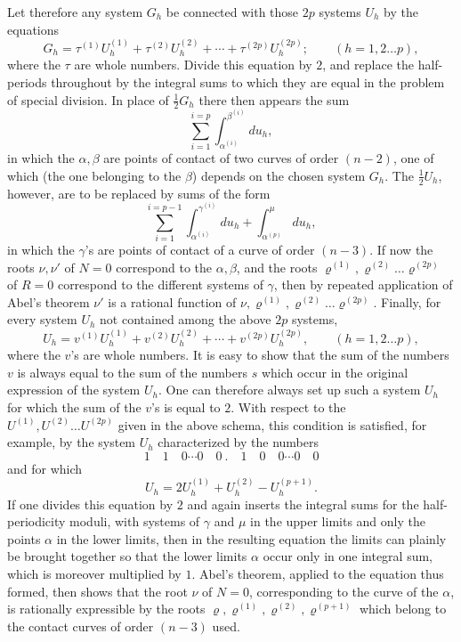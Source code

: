 \documentclass[10pt]{article}
\begin{document}
Let therefore any system \(G_h\) be connected with those \(2p\) systems \(U_h\) by the equations
\[
G_h=\tau^{(1)}U_h^{(1)}+\tau^{(2)}U_h^{(2)}
+\cdots+\tau^{(2p)}U_h^{(2p)};
\qquad (h=1,2\ldots p),
\]
where the \(\tau\) are whole numbers. Divide this equation by \(2\), and replace the half-periods throughout by the integral sums to which they are equal in the problem of special division. In place of \(\frac12G_h\) there then appears the sum
\[
\sum_{i=1}^{i=p}\int_{\alpha^{(i)}}^{\beta^{(i)}}du_h,
\]
in which the \(\alpha,\beta\) are points of contact of two curves of order \((n-2)\), one of which (the one belonging to the \(\beta\)) depends on the chosen system \(G_h\). The \(\frac12U_h\), however, are to be replaced by sums of the form
\[
\sum_{i=1}^{i=p-1}\int_{\alpha^{(i)}}^{\gamma^{(i)}}du_h
+\int_{\alpha^{(p)}}^{\mu}du_h,
\]
in which the \(\gamma\)'s are points of contact of a curve of order \((n-3)\). If now the roots \(\nu,\nu'\) of \(N=0\) correspond to the \(\alpha,\beta\), and the roots \(\varrho^{(1)},\varrho^{(2)}\ldots\varrho^{(2p)}\) of \(R=0\) correspond to the different systems of \(\gamma\), then by repeated application of Abel's theorem \(\nu'\) is a rational function of \(\nu,\varrho^{(1)},\varrho^{(2)}\ldots\varrho^{(2p)}\). Finally, for every system \(U_h\) not contained among the above \(2p\) systems,
\[
U_h=v^{(1)}U_h^{(1)}+v^{(2)}U_h^{(2)}
+\cdots+v^{(2p)}U_h^{(2p)},\qquad (h=1,2\ldots p),
\]
where the \(v\)'s are whole numbers. It is easy to show that the sum of the numbers \(v\) is always equal to the sum of the numbers \(s\) which occur in the original expression of the system \(U_h\). One can therefore always set up such a system \(U_h\) for which the sum of the \(v\)'s is equal to \(2\). With respect to the \(U^{(1)},U^{(2)}\ldots U^{(2p)}\) given in the above schema, this condition is satisfied, for example, by the system \(U_h\) characterized by the numbers
\[
1\quad1\quad0\cdots0\quad0\ .\quad1\quad0\quad0\cdots0\quad0
\]
and for which
\[
U_h=2U_h^{(1)}+U_h^{(2)}-U_h^{(p+1)}.
\]
If one divides this equation by \(2\) and again inserts the integral sums for the half-periodicity moduli, with systems of \(\gamma\) and \(\mu\) in the upper limits and only the points \(\alpha\) in the lower limits, then in the resulting equation the limits can plainly be brought together so that the lower limits \(\alpha\) occur only in one integral sum, which is moreover multiplied by \(1\). Abel's theorem, applied to the equation thus formed, then shows that the root \(\nu\) of \(N=0\), corresponding to the curve of the \(\alpha\), is rationally expressible by the roots \(\varrho,\varrho^{(1)},\varrho^{(2)},\varrho^{(p+1)}\) which belong to the contact curves of order \((n-3)\) used.
\end{document}
